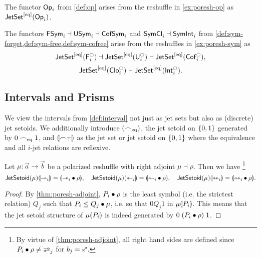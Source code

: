 \documentclass[a4paper]{memoir}
\begin{document}
\begin{example} \label{ex:poresh-op-jetset}
	The functor ${\mathsf{Op}}_i$ from \cref{def:op} arises from the reshuffle in \cref{ex:poresh-op} as $\mathsf{JetSet}^{[{\mathrm{eq}}]}({\mathsf{Op}}_i)$.
\end{example}
\begin{example} \label{ex:poresh-sym-jetset}
	The functors $\mathsf{FSym}_i \dashv \mathsf{USym}_i \dashv \mathsf{CofSym}_i$ and $\mathsf{SymCl}_i \dashv \mathsf{SymInt}_i$ from \cref{def:sym-forget,def:sym-free,def:sym-cofree} arise from the reshuffles in \cref{ex:poresh-sym} as
	\[
		\jetsetl{\Fsymresh_i} \dashv \jetsetl{\Usymresh_i} \dashv \jetsetl{\Csymresh_i},
	\]
	\[
		\jetsetl{\UFsymresh_i} \dashv \jetsetl{\UCsymresh_i}.
	\]
\end{example}

\subsection{Intervals and Prisms}
\begin{definition} \label{def:jetsetoid-interval}
	We view the intervals from \cref{def:interval} not just as jet sets but also as (discrete) jet setoids. We additionally introduce ${\llparenthesis {\frown}_{{\mathrm{eq}}} \rrparenthesis}$, the jet setoid on $\mathopen{}\left\{ 0, 1 \right\}\mathclose{}$ generated by $0 \frown_{{\mathrm{eq}}} 1$, and ${\llparenthesis {\frown}_\top \rrparenthesis}$ as the jet set or jet setoid on $\mathopen{}\left\{ 0, 1 \right\}\mathclose{}$ where the equivalence and all $i$-jet relations are reflexive.
\end{definition}
\begin{proposition} \label{thm:poresh-jetsetoid-intervals}
	Let $\mu : \vec a \to \vec b$ be a polarized reshuffle with right adjoint $\mu \dashv \rho$. Then we have%
	\footnote{By virtue of \cref{thm:poresh-adjoint}, all right hand sides are defined since $P_i \oriof \rho \neq \infrajetsym_j$ for $b_j = \ypolar$.}
	\begin{equation}
		\mathsf{JetSetoid}(\mu) {\llparenthesis {\rightarrowtriangle}_i \rrparenthesis} = {\llparenthesis {\rightarrowtriangle}_i \mathbin{\bullet} \rho \rrparenthesis}, \quad
		\mathsf{JetSetoid}(\mu) {\llparenthesis {\leftarrowtriangle}_i \rrparenthesis} = {\llparenthesis {\leftarrowtriangle}_i \mathbin{\bullet} \rho \rrparenthesis}, \quad
		\mathsf{JetSetoid}(\mu) {\llparenthesis {\leftrightarrowtriangle}_i \rrparenthesis} = {\llparenthesis {\leftrightarrowtriangle}_i \mathbin{\bullet} \rho \rrparenthesis}.
		\label{eq:poresh-jetsetoid-intervals}
	\end{equation}
\end{proposition}
\begin{proof}
	By \cref{thm:poresh-adjoint}, $P_i \mathbin{\bullet} \rho$ is the least symbol (i.e. the strictest relation) $Q_j$ such that $P_i \leq Q_j \mathbin{\bullet} \mu$, i.e. so that $0 \mathrel{Q_j} 1$ in $\mu {\llparenthesis P_i \rrparenthesis}$.
	This means that the jet setoid structure of $\mu {\llparenthesis P_i \rrparenthesis}$ is indeed generated by $0 \mathrel{(P_i \mathbin{\bullet} \rho)} 1$.
\end{proof}
\end{document}
